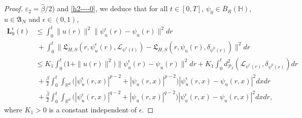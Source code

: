 \documentclass[10pt,a4paper]{amsart}
\renewcommand{\leq}{\leqslant}
\begin{document}
\begin{proof}
$\varepsilon_2=\widehat{\beta}/2$) and \eqref{h2----0},
we deduce that for all $t\in[0,T]$, $\psi_{0}\in \overline{B}_{R}(\mathbb{H})$,
$u\in \mathfrak{A}_N$ and $\epsilon\in(0,1)$,
\begin{align}
\label{SCE6}
\textbf{L}^\epsilon_{9}(t)
&\leq
\int_0^{t}
\|u(r)\|^2\|\psi^\epsilon_u(r)
-\psi_u(r)
\|^2dr\nonumber\\&\ +
\int_0^{t}
    \big\|\mathfrak{L}_{H,S}(r,\psi^\epsilon_u(r),
\mathcal{L}_{
\psi^\epsilon(t)}) - \mathfrak{L}_{H,S}(r,\psi_u(r),
\delta_{\psi^0(r)})
\big\|^2 dr
\nonumber\\&\leq K_1
\int_0^{t}
\big(1
+\|u(r)\|^2\big)\|\psi^\epsilon_u(r)
-\psi_u(r)
\|^2dr
+ K_1\int_0^{t}
d_{\mathcal{P}_2}^2
(\mathcal{L}_{
\psi^\epsilon(r)},\delta_{\psi^0(r)})dr
\nonumber\\&\ +\frac{\beta}{2}\int_0^{t} \int_{\mathbb{R}^d}  \big(|\psi^\epsilon_u(r,x)|^{p-2}
+|\psi_u(r,x)|^{p-2}\big)
|\psi^\epsilon_u(r,x)-\psi_u(r,x)|^2dxdr
\nonumber\\&\ +\frac{\widehat{\beta}}{2}
\int_0^{t} \int_{\mathbb{R}^d}  \big(|\psi^\epsilon_u(r,x)|^{q-2}
+|\psi_u(r,x)|^{q-2}\big)
|\psi^\epsilon_u(r,x)-\psi_u(r,x)|^2dxdr,
\end{align}
where $K_1>0$ is a constant independent of $\epsilon$.


\end{proof}
\end{document}
